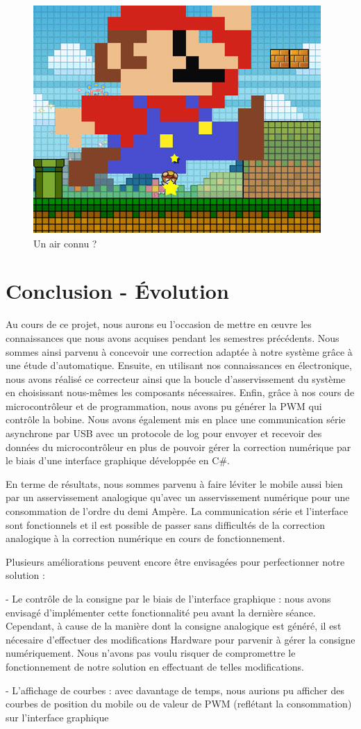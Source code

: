 \documentclass[11pt, french]{article} %
\begin{document}
\begin{figure}[h!]
	\centering
	\includegraphics[width = 4 cm]{SolutionNumerique/mario.png} 
	\caption{Un air connu ?}
\end{figure}
 
 \pagebreak
\section*{Conclusion - Évolution}

Au cours de ce projet, nous aurons eu l'occasion de mettre en œuvre les connaissances que nous avons acquises pendant les semestres précédents. Nous sommes ainsi parvenu à concevoir une correction adaptée à notre système grâce à une étude d'automatique. Ensuite, en utilisant nos connaissances en électronique, nous avons réalisé ce correcteur ainsi que la boucle d'asservissement du système en choisissant nous-mêmes les composants nécessaires. Enfin, grâce à nos cours de microcontrôleur et de programmation, nous avons pu générer la PWM qui contrôle la bobine. Nous avons également mis en place une communication série asynchrone par USB avec un protocole de log pour envoyer et recevoir des données du microcontrôleur en plus de pouvoir gérer la correction numérique par le biais d'une interface graphique développée en C\#. 

\medskip

En terme de résultats, nous sommes parvenu à faire léviter le mobile aussi bien par un asservissement analogique qu'avec un asservissement numérique pour une consommation de l'ordre du demi Ampère. La communication série et l'interface sont fonctionnels et il est possible de passer sans difficultés de la correction analogique à la correction numérique en cours de fonctionnement. 

\medskip

Plusieurs améliorations peuvent encore être envisagées pour perfectionner notre solution :

- Le contrôle de la consigne par le biais de l'interface graphique : nous avons envisagé d'implémenter cette fonctionnalité peu avant la dernière séance. Cependant, à cause de la manière dont la consigne analogique est généré, il est nécesaire d'effectuer des modifications Hardware pour parvenir à gérer la consigne numériquement. Nous n'avons pas voulu risquer de compromettre le fonctionnement de notre solution en effectuant de telles modifications.

- L'affichage de courbes : avec davantage de temps, nous aurions pu afficher des courbes de position du mobile ou de valeur de PWM (reflétant la consommation) sur l'interface graphique
\end{document}
